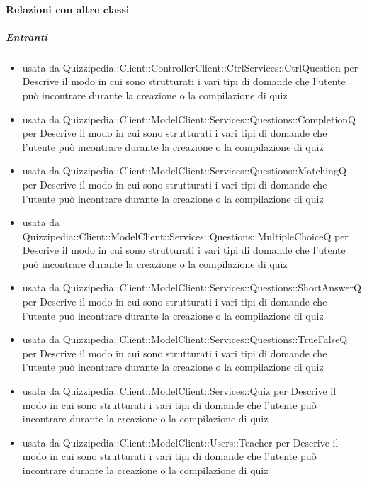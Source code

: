 \paragraph{Relazioni con altre classi}
\subparagraph{Entranti}
\begin{itemize}
\item usata da Quizzipedia::Client::ControllerClient::CtrlServices::CtrlQuestion per Descrive il modo in cui sono strutturati i vari tipi di domande che l'utente può incontrare durante la creazione o la compilazione di quiz
\item usata da Quizzipedia::Client::ModelClient::Services::Questions::CompletionQ per Descrive il modo in cui sono strutturati i vari tipi di domande che l'utente può incontrare durante la creazione o la compilazione di quiz
\item usata da Quizzipedia::Client::ModelClient::Services::Questions::MatchingQ per Descrive il modo in cui sono strutturati i vari tipi di domande che l'utente può incontrare durante la creazione o la compilazione di quiz
\item usata da Quizzipedia::Client::ModelClient::Services::Questions::MultipleChoiceQ per Descrive il modo in cui sono strutturati i vari tipi di domande che l'utente può incontrare durante la creazione o la compilazione di quiz
\item usata da Quizzipedia::Client::ModelClient::Services::Questions::ShortAnswerQ per Descrive il modo in cui sono strutturati i vari tipi di domande che l'utente può incontrare durante la creazione o la compilazione di quiz
\item usata da Quizzipedia::Client::ModelClient::Services::Questions::TrueFalseQ per Descrive il modo in cui sono strutturati i vari tipi di domande che l'utente può incontrare durante la creazione o la compilazione di quiz
\item usata da Quizzipedia::Client::ModelClient::Services::Quiz per Descrive il modo in cui sono strutturati i vari tipi di domande che l'utente può incontrare durante la creazione o la compilazione di quiz
\item usata da Quizzipedia::Client::ModelClient::Users::Teacher per Descrive il modo in cui sono strutturati i vari tipi di domande che l'utente può incontrare durante la creazione o la compilazione di quiz
\end{itemize}
